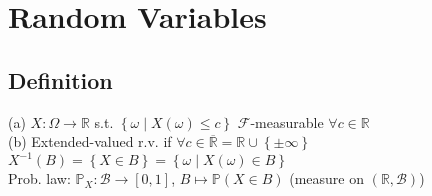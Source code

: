 \section{Random Variables}

	\subsection*{Definition}
	(a) $X: \Omega\to\mathbb{R}$ s.t. $\left\{\omega\mid X\left(\omega\right)\leq c\right\}$ $\mathcal{F}$-measurable $\forall c\in\mathbb{R}$\\
	(b) Extended-valued r.v. if $\forall c\in\overline{\mathbb{R}} = \mathbb{R}\cup\left\{\pm\infty\right\}$\\
	$X^{-1}\left(B\right) = \left\{X\in B\right\} = \left\{\omega\mid X\left(\omega\right)\in B\right\}$\\
	Prob. law: $\mathbb{P}_{X}: \mathcal{B}\to\left[0, 1\right]$, $B\mapsto\mathbb{P}\left(X\in B\right)$ (measure on $\left(\mathbb{R}, \mathcal{B}\right)$)
	